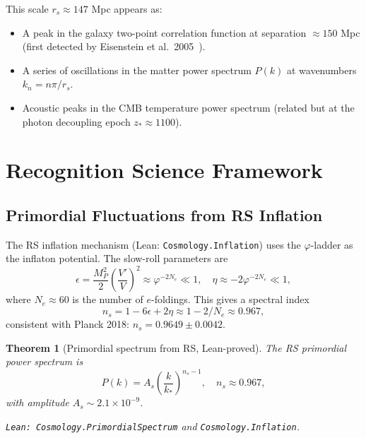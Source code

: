 \documentclass[12pt,a4paper]{article}
\newtheorem{theorem}{Theorem}[section]
\theoremstyle{definition}
\theoremstyle{remark}
\begin{document}
This scale $r_s \approx 147$ Mpc appears as:
\begin{itemize}
  \item A peak in the galaxy two-point correlation function at
        separation $\approx 150$ Mpc (first detected by
        Eisenstein et al.\ 2005~\cite{Eisenstein2005}).
  \item A series of oscillations in the matter power spectrum $P(k)$
        at wavenumbers $k_n = n\pi/r_s$.
  \item Acoustic peaks in the CMB temperature power spectrum (related but
        at the photon decoupling epoch $z_* \approx 1100$).
\end{itemize}

\section{Recognition Science Framework}
\label{sec:rs}

\subsection{Primordial Fluctuations from RS Inflation}

The RS inflation mechanism (Lean: \texttt{Cosmology.Inflation})
uses the $\varphi$-ladder as the inflaton potential.  The slow-roll
parameters are
\begin{equation}
  \epsilon = \frac{M_P^2}{2}\left(\frac{V'}{V}\right)^2
  \approx \varphi^{-2N_e} \ll 1,
  \quad \eta \approx -2\varphi^{-2N_e} \ll 1,
\end{equation}
where $N_e \approx 60$ is the number of $e$-foldings.  This gives a
spectral index
\begin{equation}
  n_s = 1 - 6\epsilon + 2\eta \approx 1 - 2/N_e \approx 0.967,
  \label{eq:ns}
\end{equation}
consistent with Planck 2018: $n_s = 0.9649 \pm 0.0042$.

\begin{theorem}[Primordial spectrum from RS, Lean-proved]
\label{thm:spectrum}
The RS primordial power spectrum is
\begin{equation}
  P(k) = A_s\left(\frac{k}{k_*}\right)^{n_s - 1},
  \quad n_s \approx 0.967,
\end{equation}
with amplitude $A_s \sim 2.1 \times 10^{-9}$.

\texttt{Lean: Cosmology.PrimordialSpectrum} and \texttt{Cosmology.Inflation}.
\end{theorem}
\end{document}
